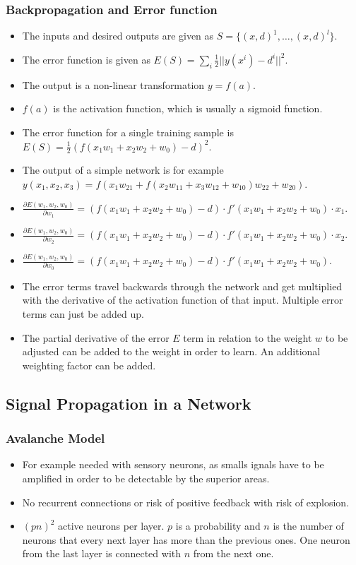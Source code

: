 \documentclass[main]{subfiles}
\begin{document}
\subsubsection{Backpropagation and Error function}
\begin{itemize}[noitemsep,nolistsep]
	\item The inputs and desired outputs are given as $S=\{(x,d)^1,\ldots,(x,d)^l\}$.
	\item The error function is given as $E(S) = \sum_i\frac{1}{2}||y(x^i)-d^i||^2$.
	\item The output is a non-linear transformation $y=f(a)$.
	\item $f(a)$ is the activation function, which is usually a sigmoid function.
	\item The error function for a single training sample is $E(S)=\frac{1}{2}(f(x_1w_1+x_2w_2+w_0)-d)^2$.
	\item The output of a simple network is for example $y(x_1,x_2,x_3)=f(x_1w_{21}+f(x_2w_{11}+x_3w_{12}+w_{10})w_{22}+w_{20})$.
	\item $\frac{\partial E(w_1,w_2,w_0)}{\partial w_1}=(f(x_1w_1+x_2w_2+w_0)-d)\cdot f'(x_1w_1+x_2w_2+w_0)\cdot x_1$.
	\item $\frac{\partial E(w_1,w_2,w_0)}{\partial w_2}=(f(x_1w_1+x_2w_2+w_0)-d)\cdot f'(x_1w_1+x_2w_2+w_0)\cdot x_2$.
	\item $\frac{\partial E(w_1,w_2,w_0)}{\partial w_0}=(f(x_1w_1+x_2w_2+w_0)-d)\cdot f'(x_1w_1+x_2w_2+w_0)$.
	\item The error terms travel backwards through the network and get multiplied with the derivative of the activation function of that input. Multiple error terms can just be added up.
	\item The partial derivative of the error $E$ term in relation to the weight $w$ to be adjusted can be added to the weight in order to learn. An additional weighting factor can be added.
\end{itemize}

\subsection{Signal Propagation in a Network}
\subsubsection{Avalanche Model}
\begin{itemize}[noitemsep,nolistsep]
	\item For example needed with sensory neurons, as smalls ignals have to be amplified in order to be detectable by the superior areas.
	\item No recurrent connections or risk of positive feedback with risk of explosion.
	\item $(pn)^2$ active neurons per layer. $p$ is a probability and $n$ is the number of neurons that every next layer has more than the previous ones. One neuron from the last layer is connected with $n$ from the next one.
\end{itemize}
\end{document}
